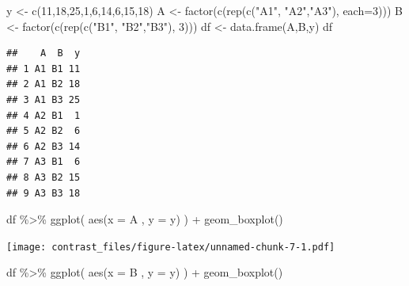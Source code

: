 \documentclass[
]{book}
\newenvironment{Shaded}{\begin{snugshade}}{\end{snugshade}}
\newcommand{\AttributeTok}[1]{\textcolor[rgb]{0.77,0.63,0.00}{#1}}
\newcommand{\DecValTok}[1]{\textcolor[rgb]{0.00,0.00,0.81}{#1}}
\newcommand{\FunctionTok}[1]{\textcolor[rgb]{0.00,0.00,0.00}{#1}}
\newcommand{\NormalTok}[1]{#1}
\newcommand{\OtherTok}[1]{\textcolor[rgb]{0.56,0.35,0.01}{#1}}
\newcommand{\SpecialCharTok}[1]{\textcolor[rgb]{0.00,0.00,0.00}{#1}}
\newcommand{\StringTok}[1]{\textcolor[rgb]{0.31,0.60,0.02}{#1}}
\begin{document}
\begin{Shaded}
\begin{Highlighting}[]
\NormalTok{y }\OtherTok{\textless{}{-}} \FunctionTok{c}\NormalTok{(}\DecValTok{11}\NormalTok{,}\DecValTok{18}\NormalTok{,}\DecValTok{25}\NormalTok{,}\DecValTok{1}\NormalTok{,}\DecValTok{6}\NormalTok{,}\DecValTok{14}\NormalTok{,}\DecValTok{6}\NormalTok{,}\DecValTok{15}\NormalTok{,}\DecValTok{18}\NormalTok{)}
\NormalTok{A }\OtherTok{\textless{}{-}} \FunctionTok{factor}\NormalTok{(}\FunctionTok{c}\NormalTok{(}\FunctionTok{rep}\NormalTok{(}\FunctionTok{c}\NormalTok{(}\StringTok{"A1"}\NormalTok{, }\StringTok{"A2"}\NormalTok{,}\StringTok{"A3"}\NormalTok{), }\AttributeTok{each=}\DecValTok{3}\NormalTok{)))}
\NormalTok{B }\OtherTok{\textless{}{-}} \FunctionTok{factor}\NormalTok{(}\FunctionTok{c}\NormalTok{(}\FunctionTok{rep}\NormalTok{(}\FunctionTok{c}\NormalTok{(}\StringTok{"B1"}\NormalTok{, }\StringTok{"B2"}\NormalTok{,}\StringTok{"B3"}\NormalTok{), }\DecValTok{3}\NormalTok{)))}
\NormalTok{df }\OtherTok{\textless{}{-}} \FunctionTok{data.frame}\NormalTok{(A,B,y)}
\NormalTok{df}
\end{Highlighting}
\end{Shaded}

\begin{verbatim}
##    A  B  y
## 1 A1 B1 11
## 2 A1 B2 18
## 3 A1 B3 25
## 4 A2 B1  1
## 5 A2 B2  6
## 6 A2 B3 14
## 7 A3 B1  6
## 8 A3 B2 15
## 9 A3 B3 18
\end{verbatim}

\begin{Shaded}
\begin{Highlighting}[]
\NormalTok{df }\SpecialCharTok{\%\textgreater{}\%}  \FunctionTok{ggplot}\NormalTok{( }\FunctionTok{aes}\NormalTok{(}\AttributeTok{x =}\NormalTok{ A , }\AttributeTok{y =}\NormalTok{ y) ) }\SpecialCharTok{+}  \FunctionTok{geom\_boxplot}\NormalTok{()}
\end{Highlighting}
\end{Shaded}

\texttt{[image: contrast\_files/figure-latex/unnamed-chunk-7-1.pdf]}

\begin{Shaded}
\begin{Highlighting}[]
\NormalTok{df }\SpecialCharTok{\%\textgreater{}\%}  \FunctionTok{ggplot}\NormalTok{( }\FunctionTok{aes}\NormalTok{(}\AttributeTok{x =}\NormalTok{ B , }\AttributeTok{y =}\NormalTok{ y) ) }\SpecialCharTok{+}  \FunctionTok{geom\_boxplot}\NormalTok{()}
\end{Highlighting}
\end{Shaded}
\end{document}
